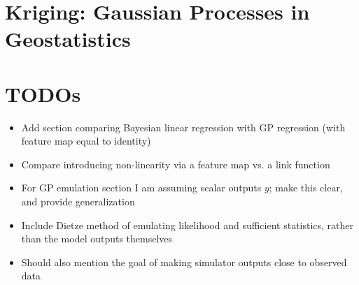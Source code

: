 \documentclass[12pt]{article}
\begin{document}
\section{Kriging: Gaussian Processes in Geostatistics}

\section{TODOs}
\begin{itemize}
\item Add section comparing Bayesian linear regression with GP regression (with feature map equal to identity)
\item Compare introducing non-linearity via a feature map vs. a link function 
\item For GP emulation section I am assuming scalar outputs $y$; make this clear, and provide generalization
\item Include Dietze method of emulating likelihood and sufficient statistics, rather than the model outputs themselves
\item Should also mention the goal of making simulator outputs close to observed data
\end{itemize}
\end{document}
